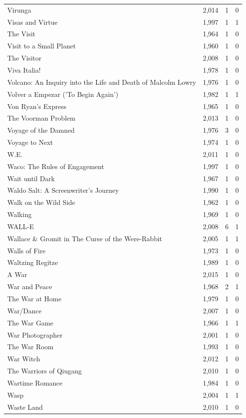 \begin{tabular}{lrrr}
Virunga & 2,014 & 1 & 0 \\
Visas and Virtue & 1,997 & 1 & 1 \\
The Visit & 1,964 & 1 & 0 \\
Visit to a Small Planet & 1,960 & 1 & 0 \\
The Visitor & 2,008 & 1 & 0 \\
Viva Italia! & 1,978 & 1 & 0 \\
Volcano: An Inquiry into the Life and Death of Malcolm Lowry & 1,976 & 1 & 0 \\
Volver a Empezar ('To Begin Again') & 1,982 & 1 & 1 \\
Von Ryan's Express & 1,965 & 1 & 0 \\
The Voorman Problem & 2,013 & 1 & 0 \\
Voyage of the Damned & 1,976 & 3 & 0 \\
Voyage to Next & 1,974 & 1 & 0 \\
W.E. & 2,011 & 1 & 0 \\
Waco: The Rules of Engagement & 1,997 & 1 & 0 \\
Wait until Dark & 1,967 & 1 & 0 \\
Waldo Salt: A Screenwriter's Journey & 1,990 & 1 & 0 \\
Walk on the Wild Side & 1,962 & 1 & 0 \\
Walking & 1,969 & 1 & 0 \\
WALL-E & 2,008 & 6 & 1 \\
Wallace \& Gromit in The Curse of the Were-Rabbit & 2,005 & 1 & 1 \\
Walls of Fire & 1,973 & 1 & 0 \\
Waltzing Regitze & 1,989 & 1 & 0 \\
A War & 2,015 & 1 & 0 \\
War and Peace & 1,968 & 2 & 1 \\
The War at Home & 1,979 & 1 & 0 \\
War/Dance & 2,007 & 1 & 0 \\
The War Game & 1,966 & 1 & 1 \\
War Photographer & 2,001 & 1 & 0 \\
The War Room & 1,993 & 1 & 0 \\
War Witch & 2,012 & 1 & 0 \\
The Warriors of Qiugang & 2,010 & 1 & 0 \\
Wartime Romance & 1,984 & 1 & 0 \\
Wasp & 2,004 & 1 & 1 \\
Waste Land & 2,010 & 1 & 0 \\

\end{tabular}
